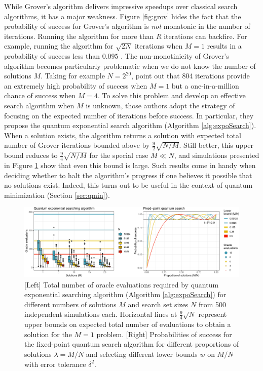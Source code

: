 \documentclass[12pt]{article} %
\begin{document}
 While Grover's algorithm delivers impressive speedups over classical search algorithms, it has a major weakness.
 Figure \ref{fig:grov} hides the fact that the probability of success for Grover's algorithm is \emph{not} monatonic in the number of iterations.  Running the algorithm for more than $R$ iterations can backfire.  For example, running the algorithm for $\sqrt{2N}$ iterations when $M=1$ results in a probability of success less than $0.095$ \citep{boyer1998tight}.  The non-monotinicity of Grover's algorithm becomes particularly problematic when we do not know the number of solutions $M$. Taking for example $N=2^{20}$, \citet{boyer1998tight} point out that 804 iterations provide an extremely high probability of success when $M=1$ but a one-in-a-million chance of success when $M=4$.  To solve this problem and develop an effective search algorithm when $M$ is unknown, those authors adopt the strategy of focusing on the expected number of iterations before success. In particular, they propose the quantum exponential search algorithm (Algorithm \ref{alg:expoSearch}).  When a solution exists, the algorithm returns a solution with expected total number of Grover iterations bounded above by $\frac{9}{2}\sqrt{N/M}$.  Still better, this upper bound reduces to $\frac{9}{4}\sqrt{N/M}$ for the special case $M\ll N$, and simulations presented in Figure \ref{fig:expo} show that even this bound is large.  Such results come in handy when deciding whether to halt the algorithm's progress if one believes it possible that no solutions exist.  Indeed, this turns out to be useful in the context of quantum minimization (Section \ref{sec:qmin}).
 

 
 \begin{figure}[!tp]
 	\centering
 	\includegraphics[width=1\linewidth]{searchingFigs.pdf}
 	\caption{[Left] Total number of oracle evaluations required by quantum exponential searching algorithm (Algorithm \ref{alg:expoSearch}) for different numbers of solutions $M$ and search set sizes $N$ from 500 independent simulations each.  Horizontal lines at $\frac{9}{4}\sqrt{N}$ represent upper bounds on expected total number of evaluations to obtain a solution for the $M=1$ problem. [Right] Probabilities of success for the fixed-point quantum search algorithm \citep{yoder2014fixed} for different proportions of solutions $\lambda=M/N$ and selecting different lower bounds $w$ on $M/N$ with error tolerance $\delta^2$. }\label{fig:expo}
 \end{figure}
\end{document}

